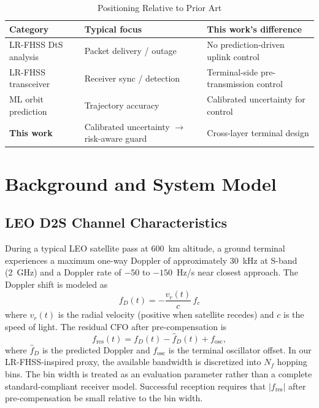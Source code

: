 \documentclass[conference]{IEEEtran}
\begin{document}
\begin{table}[htbp]
\small
\caption{Positioning Relative to Prior Art}
\label{tab:related}
\begin{tabular}{p{2.0cm}p{2.6cm}p{2.7cm}}
\toprule
Category & Typical focus & This work's difference \\
\midrule
LR-FHSS DtS analysis & Packet delivery / outage & No prediction-driven uplink control \\
LR-FHSS transceiver & Receiver sync / detection & Terminal-side pre-transmission control \\
ML orbit prediction & Trajectory accuracy & Calibrated uncertainty for control \\
\midrule
\textbf{This work} & Calibrated uncertainty $\rightarrow$ risk-aware guard & Cross-layer terminal design \\
\bottomrule
\end{tabular}
\end{table}

\section{Background and System Model}
\label{sec:system}

\subsection{LEO D2S Channel Characteristics}
During a typical LEO satellite pass at 600~km altitude, a ground terminal experiences a maximum one-way Doppler of approximately 30~kHz at S-band (2~GHz) and a Doppler rate of $-50$ to $-150$~Hz/s near closest approach. The Doppler shift is modeled as
\begin{equation}
f_D(t) = -\frac{v_r(t)}{c}\,f_c
\label{eq:doppler}
\end{equation}
where $v_r(t)$ is the radial velocity (positive when satellite recedes) and $c$ is the speed of light. The residual CFO after pre-compensation is
\begin{equation}
f_{\mathrm{res}}(t) = f_D(t) - \hat{f}_D(t) + f_{\mathrm{osc}},
\label{eq:residual_cfo}
\end{equation}
where $\hat{f}_D$ is the predicted Doppler and $f_{\mathrm{osc}}$ is the terminal oscillator offset. In our LR-FHSS-inspired proxy, the available bandwidth is discretized into $N_f$ hopping bins. The bin width is treated as an evaluation parameter rather than a complete standard-compliant receiver model. Successful reception requires that $|f_{\mathrm{res}}|$ after pre-compensation be small relative to the bin width.
\end{document}
